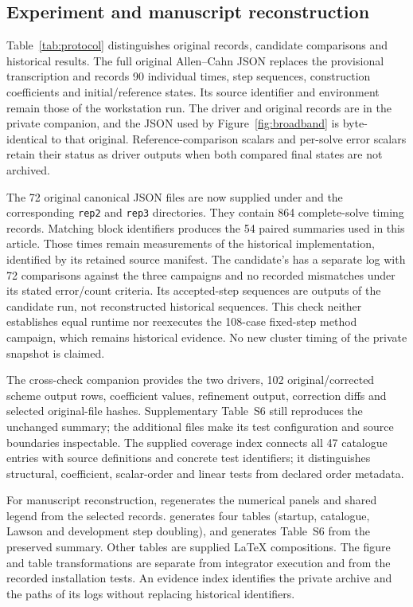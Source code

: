 \subsection{Experiment and manuscript reconstruction}

Table~\ref{tab:protocol} distinguishes original records, candidate
comparisons and historical results.  The full original Allen--Cahn JSON
replaces the provisional transcription and records 90 individual times,
step sequences, construction coefficients and initial/reference states.
Its source identifier and environment remain those of the workstation run.
The driver and original records are in the private companion, and the JSON
used by Figure~\ref{fig:broadband} is byte-identical to that original.
Reference-comparison scalars and per-solve error scalars retain their status
as driver outputs when both compared final states are not archived.

The 72 original canonical JSON files are now supplied under
 and the corresponding
\texttt{rep2} and \texttt{rep3} directories.  They contain 864 complete-solve
timing records.  Matching block identifiers produces the 54 paired
summaries used in this article.  Those times remain measurements of the
historical implementation, identified by its retained source manifest.
The candidate's  has a separate log
with 72 comparisons against the three campaigns and no recorded
mismatches under its stated error/count criteria.  Its accepted-step
sequences are outputs of the candidate run, not reconstructed historical
sequences.  This check neither establishes equal runtime nor reexecutes the
108-case fixed-step method campaign, which remains historical evidence.
No new cluster timing of the private snapshot is claimed.

The cross-check companion provides the two drivers, 102 original/corrected
scheme output rows, coefficient values, refinement output, correction diffs
and selected original-file hashes.  Supplementary Table~S6 still reproduces
the unchanged summary; the additional files make its test configuration and
source boundaries inspectable.  The supplied coverage index connects all
47 catalogue entries with source definitions and concrete test identifiers;
it distinguishes structural, coefficient, scalar-order and linear tests
from declared order metadata.

For manuscript reconstruction,
 regenerates the numerical panels and
shared legend from the selected records.
 generates four tables (startup, catalogue,
Lawson and development step doubling), and
 generates Table~S6 from the preserved
summary.  Other tables are supplied LaTeX compositions.  The figure and
table transformations are separate from integrator execution and from the
recorded installation tests.  An evidence index identifies the private
archive and the paths of its logs without replacing historical identifiers.

